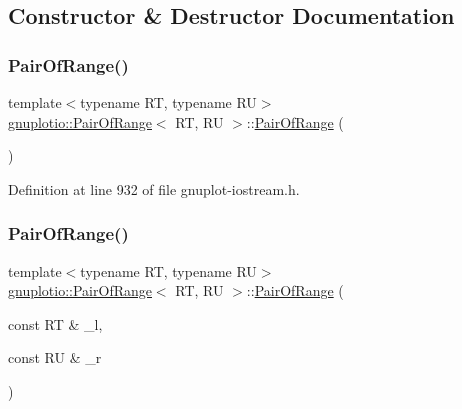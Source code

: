 \subsection{Constructor \& Destructor Documentation}
\mbox{\label{classgnuplotio_1_1_pair_of_range_a94b7cbc319a066dc9744ea1407163fb0}} 
\subsubsection{\texorpdfstring{Pair\+Of\+Range()}{PairOfRange()}\hspace{0.1cm}{\footnotesize\ttfamily [1/2]}}
{\footnotesize\ttfamily template$<$typename RT, typename RU$>$ \\
\hyperlink{classgnuplotio_1_1_pair_of_range}{gnuplotio\+::\+Pair\+Of\+Range}$<$ RT, RU $>$\+::\hyperlink{classgnuplotio_1_1_pair_of_range}{Pair\+Of\+Range} (\begin{DoxyParamCaption}{ }\end{DoxyParamCaption})\hspace{0.3cm}{\ttfamily [inline]}}



Definition at line 932 of file gnuplot-\/iostream.\+h.

\mbox{\label{classgnuplotio_1_1_pair_of_range_a15055ed8b1c0af8febf20f5a24d7dc05}} 
\subsubsection{\texorpdfstring{Pair\+Of\+Range()}{PairOfRange()}\hspace{0.1cm}{\footnotesize\ttfamily [2/2]}}
{\footnotesize\ttfamily template$<$typename RT, typename RU$>$ \\
\hyperlink{classgnuplotio_1_1_pair_of_range}{gnuplotio\+::\+Pair\+Of\+Range}$<$ RT, RU $>$\+::\hyperlink{classgnuplotio_1_1_pair_of_range}{Pair\+Of\+Range} (\begin{DoxyParamCaption}\item[{const RT \&}]{\+\_\+l,  }\item[{const RU \&}]{\+\_\+r }\end{DoxyParamCaption})\hspace{0.3cm}{\ttfamily [inline]}}




